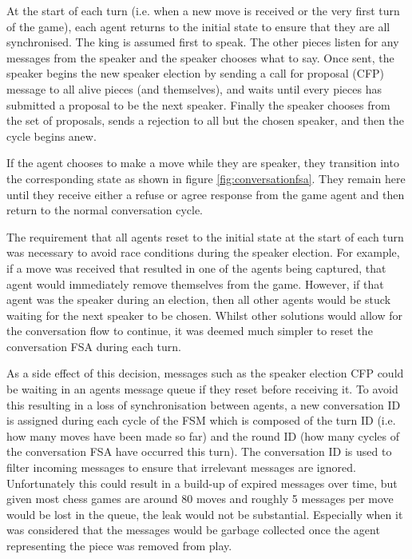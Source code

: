 \documentclass{article}
\begin{document}
At the start of each turn (i.e. when a new move is received or the very first turn of the game), each agent returns to the initial state to ensure that they are all synchronised. The king is assumed first to speak. The other pieces listen for any messages from the speaker and the speaker chooses what to say. Once sent, the speaker begins the new speaker election by sending a call for proposal (CFP) message to all alive pieces (and themselves), and waits until every pieces has submitted a proposal to be the next speaker. Finally the speaker chooses from the set of proposals, sends a rejection to all but the chosen speaker, and then the cycle begins anew.

If the agent chooses to make a move while they are speaker, they transition into the corresponding state as shown in figure \ref{fig:conversationfsa}. They remain here until they receive either a refuse or agree response from the game agent and then return to the normal conversation cycle. 

The requirement that all agents reset to the initial state at the start of each turn was necessary to avoid race conditions during the speaker election. For example, if a move was received that resulted in one of the agents being captured, that agent would immediately remove themselves from the game. However, if that agent was the speaker during an election, then all other agents would be stuck waiting for the next speaker to be chosen. Whilst other solutions would allow for the conversation flow to continue, it was deemed much simpler to reset the conversation FSA during each turn.

As a side effect of this decision, messages such as the speaker election CFP could be waiting in an agents message queue if they reset before receiving it. To avoid this resulting in a loss of synchronisation between agents, a new conversation ID is assigned during each cycle of the FSM which is composed of the turn ID (i.e. how many moves have been made so far) and the round ID (how many cycles of the conversation FSA have occurred this turn). The conversation ID is used to filter incoming messages to ensure that irrelevant messages are ignored. Unfortunately this could result in a build-up of expired messages over time, but given most chess games are around 80 moves \cite{chessdata} and roughly 5 messages per move would be lost in the queue, the leak would not be substantial. Especially when it was considered that the messages would be garbage collected once the agent representing the piece was removed from play.
\end{document}
